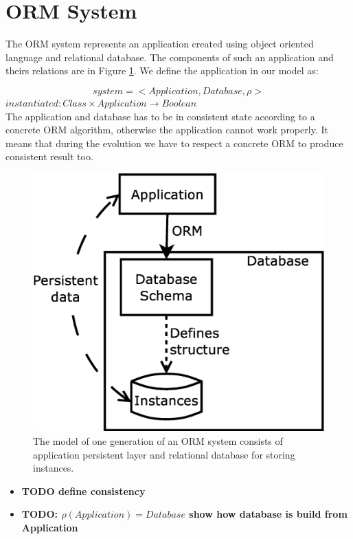 \documentclass[11pt]{article}
\begin{document}
\tableofcontents

\newpage
\section{ORM System}
The ORM system represents an application created using object oriented language and relational database. The components of such an application and theirs relations are in Figure \ref{fig:appStructure}. We define the application in our model as:

$$system = < Application, Database, \rho >$$
$instantiated : Class \times Application \rightarrow Boolean $ \\

The application and database has to be in consistent state according to a concrete ORM algorithm, otherwise the application cannot work properly. It means that during the evolution we have to respect a concrete ORM to produce consistent result too.

\begin{figure}
\begin{center}
	\includegraphics[scale=0.3]{./images/system}
	\caption{The model of one generation of an ORM system consists of application persistent layer and relational database for storing instances.}
\end{center}
	\label{fig:appStructure}
\end{figure}

\begin{itemize}
	\item \textbf{TODO define consistency}
	\item \textbf{TODO: $\rho(Application) = Database$ show how database is build from Application}
\end{itemize}
\end{document}
